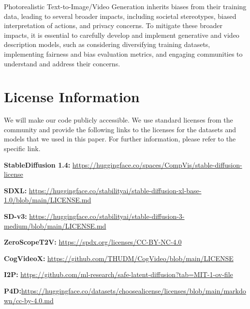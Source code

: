 Photorealistic Text-to-Image/Video Generation inherits biases from their training data, leading to several broader impacts, including societal stereotypes, biased interpretation of actions, and privacy concerns. 
To mitigate these broader impacts, it is essential to carefully develop and implement generative and video description models, such as considering diversifying training datasets, implementing fairness and bias evaluation metrics, and engaging communities to understand and address their concerns. 


\section{License Information}\label{app:license}
We will make our code publicly accessible. 
We use standard licenses from the community and provide the following links to the licenses for the datasets and models that we used in this paper. 
For further information, please refer to the specific link.

\noindent\textbf{StableDiffusion 1.4:} \href{https://huggingface.co/spaces/CompVis/stable-diffusion-license}{https://huggingface.co/spaces/CompVis/stable-diffusion-license}


\noindent\textbf{SDXL:} \href{https://huggingface.co/stabilityai/stable-diffusion-xl-base-1.0/blob/main/LICENSE.md}{https://huggingface.co/stabilityai/stable-diffusion-xl-base-1.0/blob/main/LICENSE.md}

\noindent\textbf{SD-v3:} \href{https://huggingface.co/stabilityai/stable-diffusion-3-medium/blob/main/LICENSE.md}{https://huggingface.co/stabilityai/stable-diffusion-3-medium/blob/main/LICENSE.md}

\noindent\textbf{ZeroScopeT2V:} \href{https://spdx.org/licenses/CC-BY-NC-4.0}{https://spdx.org/licenses/CC-BY-NC-4.0}

\noindent\textbf{CogVideoX:} \href{https://github.com/THUDM/CogVideo/blob/main/LICENSE}{https://github.com/THUDM/CogVideo/blob/main/LICENSE}



\noindent\textbf{I2P:} \href{https://github.com/ml-research/safe-latent-diffusion?tab=MIT-1-ov-file#readme}{https://github.com/ml-research/safe-latent-diffusion?tab=MIT-1-ov-file}

\noindent\textbf{P4D:}\href{https://huggingface.co/datasets/choosealicense/licenses/blob/main/markdown/cc-by-4.0.md}{https://huggingface.co/datasets/choosealicense/licenses/blob/main/markdown/cc-by-4.0.md}


